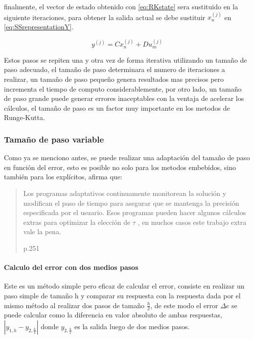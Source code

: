             \noindent finalmente, el vector de estado obtenido con \cref{eq:RKstate} sera sustituido en la siguiente iteraciones, para obtener la salida actual se debe sustituir $x_n^{(j)}$  en \cref{eq:SSrepresentationY}. 
            
            \begin{equation}
				y^{(j)} = Cx_n^{(j)} + Du_m^{(j)} \label{eq:SSrepresentationY}
            \end{equation}
            
            Estos pasos se repiten una y otra vez de forma iterativa utilizando un tamaño de paso adecuado, el tamaño de paso determinara el numero de iteraciones a realizar, un tamaño de paso pequeño genera resultados mas precisos pero incrementa el tiempo de computo considerablemente, por otro lado, un tamaño de paso grande puede generar errores inaceptables con la ventaja de acelerar los cálculos, el tamaño de paso es un factor muy importante en los metodos de Runge-Kutta.

        \subsubsection{Tamaño de paso variable}

            Como ya se menciono antes, se puede realizar una adaptación del tamaño de paso en función del error, esto es posible no solo para los metodos embebidos, sino también para los explícitos, \textcite{roganprogramacion} afirma que: \blockquote[p.251]{Los programas adaptativos continuamente monitorean la solución y modifican el paso de
            tiempo para asegurar que se mantenga la precisión especificada por el usuario. Esos programas
            pueden hacer algunos cálculos extras para optimizar la elección de $\tau$ , en muchos casos este
            trabajo extra vale la pena.}
            
            \paragraph{Calculo del error con dos medios pasos}

                Este es un método simple pero eficaz de calcular el error, consiste en realizar un paso simple de tamaño h y comparar su respuesta con la respuesta dada por el mismo método al realizar dos pasos de tamaño $\frac{h}{2}$, de este modo el error $\Delta e$ se puede calcular como la diferencia en valor absoluto de ambas respuestas, $\left|y_{1,h} - y_{2,\frac{h}{2}}\right|$ donde $y_{2,\frac{h}{2}}$ es la salida luego de dos medios pasos.
            
